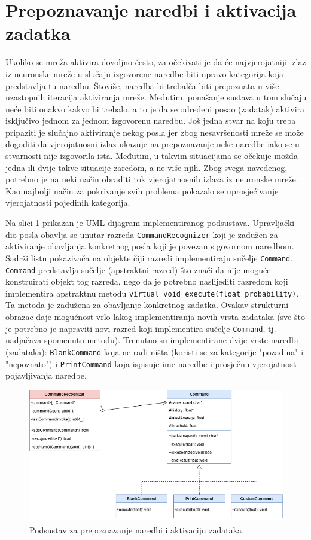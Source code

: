 \section{Prepoznavanje naredbi i aktivacija zadatka}
\label{sec:prepoy}

Ukoliko se mreža aktivira dovoljno često, za očekivati je da će najvjerojatniji izlaz iz 
neuronske mreže u slučaju izgovorene naredbe biti upravo kategorija koja predstavlja tu naredbu. 
Štoviše, naredba bi trebalča biti prepoznata u više uzastopnih iteracija aktiviranja mreže.
Međutim, ponašanje sustava u tom slučaju neće biti onakvo kakvo bi trebalo, a to je da se
određeni posao (zadatak) aktivira isključivo jednom za jednom izgovorenu naredbu. 
Još jedna stvar na koju treba pripaziti je slučajno aktiviranje nekog posla jer zbog
nesavršenosti mreže se može dogoditi da vjerojatnosni izlaz ukazuje na prepoznavanje neke
naredbe iako se u stvarnosti nije izgovorila ista. Međutim, u takvim situacijama se očekuje možda jedna ili dvije takve situacije zaredom,
a ne više njih. Zbog svega navedenog, potrebno je na neki način obraditi tok vjerojatnosnih
izlaza iz neuronske mreže. Kao najbolji način za pokrivanje svih problema pokazalo se 
uprosjećivanje vjerojatnosti pojedinih kategorija. 

Na slici \ref{pic:uml} prikazan je UML dijagram implementiranog podsustava. Upravljački dio posla
obavlja se unutar razreda \texttt{CommandRecognizer} koji je zadužen za aktiviranje obavljanja 
konkretnog posla koji je povezan s govornom naredbom. 
Sadrži listu pokazivača na objekte čiji razredi implementiraju 
sučelje \texttt{Command}. \texttt{Command} predstavlja sučelje (apstraktni razred) što znači da
nije moguće konstruirati objekt tog razreda, nego da je potrebno naslijediti razredom koji 
implementira apstraktnu metodu \texttt{virtual void execute(float probability)}. Ta 
metoda je zadužena za obavljanje konkretnog zadatka. Ovakav strukturni
obrazac daje mogućnost vrlo lakog implementiranja novih vrsta zadataka (sve što je potrebno je 
napraviti novi razred koji implementira sučelje \texttt{Command}, tj. nadjačava
spomenutu metodu). Trenutno su implementirane
dvije vrste naredbi (zadataka): \texttt{BlankCommand} koja ne radi ništa (koristi se za kategorije
"pozadina" i "nepoznato") i \texttt{PrintCommand} koja ispisuje ime naredbe i prosječnu 
vjerojatnost pojavljivanja naredbe.

\begin{figure}[htb]
    \centering
    \includegraphics[width=0.8\linewidth]{Chapters/struktura_sustava/prepoznavanje_naredbi/commands.png} 
    \caption{Podsustav za prepoznavanje naredbi i aktivaciju zadataka\cite{flowchart}}
    \label{pic:uml}
\end{figure}

